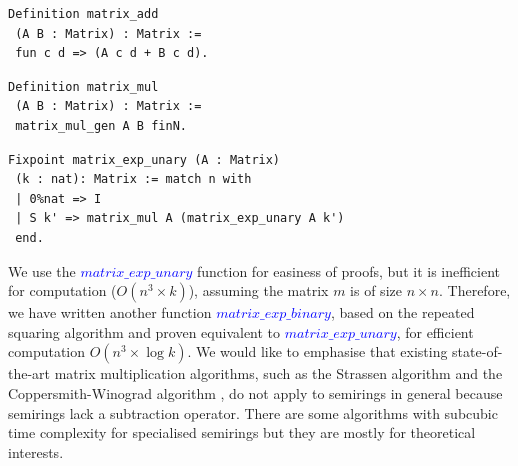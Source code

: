 \documentclass[a4paper,UKenglish,cleveref, autoref, thm-restate, anonymous]{lipics-v2021}
\begin{document}
\label{fig:definitions} 



\begin{center}
\begin{minipage}{0.4\linewidth}
\begin{lstlisting}[language=Coq]
Definition matrix_add 
 (A B : Matrix) : Matrix := 
 fun c d => (A c d + B c d).
\end{lstlisting}
\end{minipage}
\hspace{.5cm}
\begin{minipage}{0.4\linewidth}
   \begin{lstlisting}[language=Coq]
Definition matrix_mul 
 (A B : Matrix) : Matrix :=  
 matrix_mul_gen A B finN.
\end{lstlisting}
\end{minipage}
\medskip

\begin{minipage}{0.7\linewidth}{\vspace{2mm}}
\begin{lstlisting}[language=Coq]
Fixpoint matrix_exp_unary (A : Matrix) 
 (k : nat): Matrix := match n with 
 | 0%nat => I 
 | S k' => matrix_mul A (matrix_exp_unary A k')
 end.
\end{lstlisting}
   
\end{minipage}
\end{center}

\label{fig:coq_definitions}
\vspace{2mm}

We use the \textcolor{blue}{$matrix\_exp\_unary$} function for easiness of proofs, but it is 
inefficient for computation ($O(n^3 \times k)$), assuming the matrix $m$ is 
of size $n \times n$. Therefore, we have 
written another function \textcolor{blue}{$matrix\_exp\_binary$}, 
based on the repeated squaring algorithm and proven equivalent to \textcolor{blue}{$matrix\_exp\_unary$}, 
for efficient computation $O(n^3 \times \log{}k)$. 
We would like to emphasise that existing state-of-the-art matrix multiplication algorithms, such as the Strassen algorithm \cite{strassen1969gaussian} and the Coppersmith-Winograd algorithm \cite{COPPERSMITH1990251}, do not apply to semirings in general because semirings lack a subtraction operator.
 There are some algorithms \cite{vassilevska2009all,10.1145/3186893}
with subcubic time complexity for specialised semirings but they are mostly for theoretical interests. 
\end{document}
